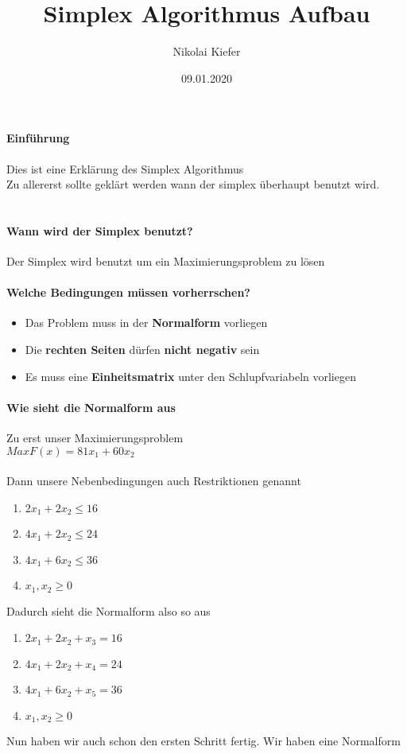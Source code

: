 \documentclass{article}
\begin{document}
\title{Simplex Algorithmus Aufbau}
\author{Nikolai Kiefer}
\date{09.01.2020}
\maketitle
\paragraph{Einführung}
Dies ist eine Erklärung des Simplex Algorithmus\\
Zu allererst sollte geklärt werden wann der simplex überhaupt benutzt wird.\\\\ 
\paragraph{Wann wird der Simplex benutzt?}
Der Simplex wird benutzt um ein Maximierungsproblem zu lösen
\paragraph{Welche Bedingungen müssen vorherrschen?}
\begin{itemize}
	\item{Das Problem muss in der \textbf{Normalform} vorliegen}
	\item{Die \textbf{rechten Seiten} dürfen \textbf{nicht negativ} sein}
	\item{Es muss eine \textbf{Einheitsmatrix} unter den Schlupfvariabeln vorliegen}
\end{itemize}
\paragraph{Wie sieht die Normalform aus}
Zu erst unser Maximierungsproblem\\
$Max F(x) = 81x_{1} + 60x_{2}$\\\\
Dann unsere Nebenbedingungen auch Restriktionen genannt
\begin{enumerate}
	\item{$2x_{1} + 2x_{2} \leq 16 $}
	\item{$4x_{1} + 2x_{2} \leq 24 $}
	\item{$4x_{1} + 6x_{2} \leq 36 $}
	\item[]{$x_{1},x_{2} \geq 0$}
\end{enumerate}
Dadurch sieht die Normalform also so aus\\
\begin{enumerate}
	\item{$2x_{1} + 2x_{2} + x_{3} = 16 $}
	\item{$4x_{1} + 2x_{2} + x_{4} = 24 $}
	\item{$4x_{1} + 6x_{2} + x_{5} = 36 $}
	\item[]{$x_{1},x_{2} \geq 0$}
\end{enumerate}
Nun haben wir auch schon den ersten Schritt fertig. Wir haben eine Normalform
\end{document}
